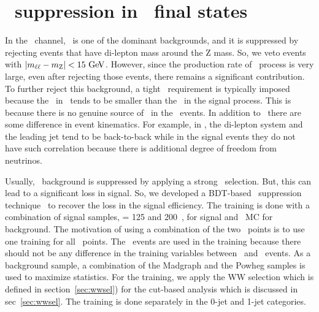 \section{\dyll\ suppression in \SF\ final states} 
\label{sec:dybkg}

In the \SF\ channel, \dyll\ is one of the dominant backgrounds, 
and it is suppressed by rejecting events that have 
di-lepton mass around the Z mass. So, we veto events with 
$\left|m_{\ell\ell} - m_{\mathrm{Z}} \right| < 15~\mathrm{Ge\kern -0.1em V}$. However, since the 
production rate of \dyll\ process is very large, even after
rejecting those events, there remains a significant contribution. 
To further reject this background, a tight \met\ requirement is typically imposed
because the \met\ in \dyll\ tends to be smaller than 
the \met\ in the signal process. 
This is because there is no genuine source of \met\ in the \dyll\ events. 
In addition to \met\ there are some difference in event kinematics.
For example, in \dyll, the di-lepton system and the leading jet tend 
to be back-to-back while in the signal events they do not have such 
correlation because there is additional degree of freedom from neutrinos.   

Usually, \dyll\ background is suppressed by applying a strong \met\ selection. 
But, this can lead to a significant loss in signal. 
So, we developed a BDT-based \dyll\ suppression technique~\cite{dymva} to recover the 
loss in the signal efficiency. 
The training is done with a combination of signal samples, \mHi = 125 and 200~\GeV, 
for signal and \dyll\ MC for background. The motivation of using a combination of the two 
\mHi\ points is to use one training for all \mHi\ points. The \DF\ events 
are used in the training because there should not be any difference in the training 
variables between \SF\ and \DF\ events. 
As a background sample, 
a combination of the Madgraph and the Powheg samples is used to maximize statistics. 
For the training, we apply the WW selection which is defined in section~\ref{sec:wwsel}) 
for the cut-based analysis
which is discussed in sec~\ref{sec:wwsel}.
The training is done separately in the 0-jet and 1-jet categories. 

